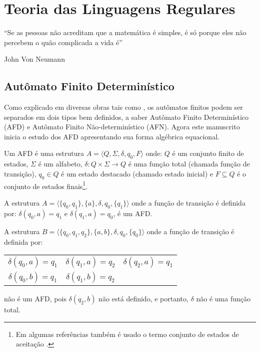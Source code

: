 \chapter{Teoria das Linguagens Regulares}\label{cap:LinguagemRegulares}


\epigraph{``Se as pessoas não acreditam que a matemática é simples, é só porque eles não percebem o quão complicada a vida é''}{John Von Neumann}

\section{Autômato Finito Determinístico}\label{sec:AFD}

Como explicado em diversas obras tais como \cite{benjaLivro2010, hopcroft2008, linz2006, menezes1998LFA}, os autômatos finitos podem ser separados em dois tipos bem definidos, a saber Autômato Finito Determinístico (AFD) e Autômato Finito Não-determinístico (AFN). Agora este manuscrito inicia o estudo dos AFD apresentando sua forma algébrica equacional.

\begin{definition}\label{def:AFD}
	Um AFD é uma estrutura $A = \langle Q, \Sigma, \delta, q_0, F\rangle$ onde: $Q$ é um conjunto finito de estados, $\Sigma$ é um alfabeto, $\delta : Q \times \Sigma \rightarrow Q$ é uma função total (chamada função de transição), $q_0 \in Q$ é um estado destacado (chamado estado inicial) e $F \subseteq Q$ é o conjunto de estados finais\footnote{Em algumas referências também é usado o termo conjunto de estados de aceitação \cite{de2010}.}.
\end{definition}

\begin{example}\label{exe:AFD}
	A estrutura $A = \langle \{q_0, q_1\}, \{a\}, \delta, q_0, \{q_1\} \rangle$ onde a função de transição é definida por: $\delta(q_0, a) = q_1$ e $\delta(q_1, a) = q_0$, é um AFD.
\end{example}

\begin{example}\label{exe:NaoEAFD}
	A estrutura $B = \langle \{q_0, q_1, q_2\}, \{a, b\}, \delta, q_0, \{q_0\} \rangle$ onde a função de transição é definida por:
	\begin{table*}[h]
		\centering
		\begin{tabular}{ccc}
			$\delta(q_0, a) = q_1$ & $\delta(q_1, a) = q_2$ & $\delta(q_2, a) = q_1$\\
			$\delta(q_0, b) = q_1$ & $\delta(q_1, b) = q_2$ & 
		\end{tabular}
	\end{table*}
	
	\noindent não é um AFD, pois $\delta(q_2, b)$ não está definido, e portanto, $\delta$ não é uma função total.
\end{example}

